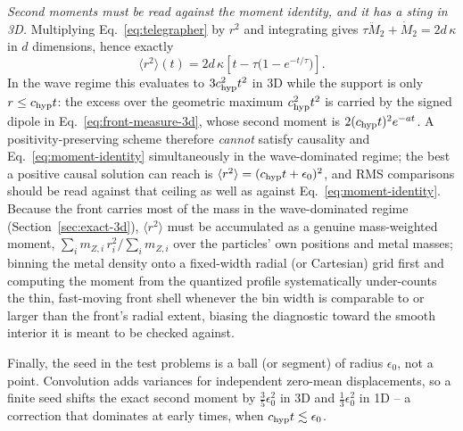 \documentclass[11pt, a4paper, parskip]{scrartcl}
\theoremstyle{plain}
\theoremstyle{definition}
\theoremstyle{remark}
\newcommand{\chyp}{c_{\rm hyp}}                           %
\newcommand{\taurelax}{\tau}                              %
\begin{document}
\emph{Second moments must be read against the moment identity, and it
has a sting in 3D.} Multiplying Eq.~\eqref{eq:telegrapher} by $r^2$ and
integrating gives $\taurelax\ddot M_2+\dot M_2=2d\,\kappa$ in $d$
dimensions, hence exactly
\begin{equation}
  \label{eq:moment-identity}
  \langle r^2\rangle(t)
  = 2d\,\kappa\left[t-\taurelax\big(1-e^{-t/\taurelax}\big)\right] .
\end{equation}
In the wave regime this evaluates to $3\chyp^2t^2$ in 3D while the
support is only $r\le\chyp t$: the excess over the geometric maximum
$\chyp^2t^2$ is carried by the signed dipole in
Eq.~\eqref{eq:front-measure-3d}, whose second moment is
$2(\chyp t)^2e^{-at}$. A positivity-preserving scheme therefore
\emph{cannot} satisfy causality and Eq.~\eqref{eq:moment-identity}
simultaneously in the wave-dominated regime; the best a positive causal
solution can reach is $\langle r^2\rangle=(\chyp t+\epsilon_0)^2$, and
RMS comparisons should be read against that ceiling as well as against
Eq.~\eqref{eq:moment-identity}. Because the front carries most of the mass
in the wave-dominated regime (Section~\ref{sec:exact-3d}), $\langle
r^2\rangle$ must be accumulated as a genuine mass-weighted moment,
$\sum_i m_{Z,i}\,r_i^2/\sum_i m_{Z,i}$ over the particles' own positions
and metal masses; binning the metal density onto a fixed-width radial (or
Cartesian) grid first and computing the moment from the quantized profile
systematically under-counts the thin, fast-moving front shell whenever the
bin width is comparable to or larger than the front's radial extent,
biasing the diagnostic toward the smooth interior it is meant to be
checked against.

Finally, the seed in the test problems is a ball (or segment) of radius
$\epsilon_0$, not a point. Convolution adds variances for independent
zero-mean displacements, so a finite seed shifts the exact second moment
by $\tfrac35\epsilon_0^2$ in 3D and $\tfrac13\epsilon_0^2$ in 1D --
a correction that dominates at early times, when $\chyp t\lesssim\epsilon_0$.


\end{document}

